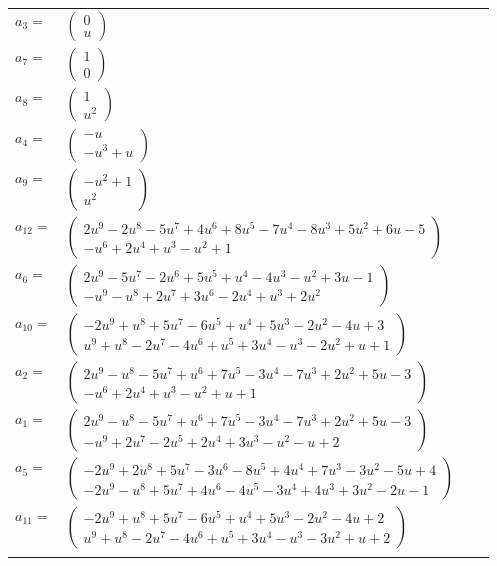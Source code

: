 \documentclass[1p]{elsarticle_modified}
\theoremstyle{definition}
\begin{document}
\begin{tabular}{m{7pt} m{180pt} m{7pt} m{180pt} }
\flushright $a_{3}=$&$\begin{pmatrix}0\\u\end{pmatrix}$ \\
\flushright $a_{7}=$&$\begin{pmatrix}1\\0\end{pmatrix}$ \\
\flushright $a_{8}=$&$\begin{pmatrix}1\\u^2\end{pmatrix}$ \\
\flushright $a_{4}=$&$\begin{pmatrix}- u\\- u^3+u\end{pmatrix}$ \\
\flushright $a_{9}=$&$\begin{pmatrix}- u^2+1\\u^2\end{pmatrix}$ \\
\flushright $a_{12}=$&$\begin{pmatrix}2 u^9-2 u^8-5 u^7+4 u^6+8 u^5-7 u^4-8 u^3+5 u^2+6 u-5\\- u^6+2 u^4+u^3- u^2+1\end{pmatrix}$ \\
\flushright $a_{6}=$&$\begin{pmatrix}2 u^9-5 u^7-2 u^6+5 u^5+u^4-4 u^3- u^2+3 u-1\\- u^9- u^8+2 u^7+3 u^6-2 u^4+u^3+2 u^2\end{pmatrix}$ \\
\flushright $a_{10}=$&$\begin{pmatrix}-2 u^9+u^8+5 u^7-6 u^5+u^4+5 u^3-2 u^2-4 u+3\\u^9+u^8-2 u^7-4 u^6+u^5+3 u^4- u^3-2 u^2+u+1\end{pmatrix}$ \\
\flushright $a_{2}=$&$\begin{pmatrix}2 u^9- u^8-5 u^7+u^6+7 u^5-3 u^4-7 u^3+2 u^2+5 u-3\\- u^6+2 u^4+u^3- u^2+u+1\end{pmatrix}$ \\
\flushright $a_{1}=$&$\begin{pmatrix}2 u^9- u^8-5 u^7+u^6+7 u^5-3 u^4-7 u^3+2 u^2+5 u-3\\- u^9+2 u^7-2 u^5+2 u^4+3 u^3- u^2- u+2\end{pmatrix}$ \\
\flushright $a_{5}=$&$\begin{pmatrix}-2 u^9+2 u^8+5 u^7-3 u^6-8 u^5+4 u^4+7 u^3-3 u^2-5 u+4\\-2 u^9- u^8+5 u^7+4 u^6-4 u^5-3 u^4+4 u^3+3 u^2-2 u-1\end{pmatrix}$ \\
\flushright $a_{11}=$&$\begin{pmatrix}-2 u^9+u^8+5 u^7-6 u^5+u^4+5 u^3-2 u^2-4 u+2\\u^9+u^8-2 u^7-4 u^6+u^5+3 u^4- u^3-3 u^2+u+2\end{pmatrix}$\\&\end{tabular}
\end{document}
